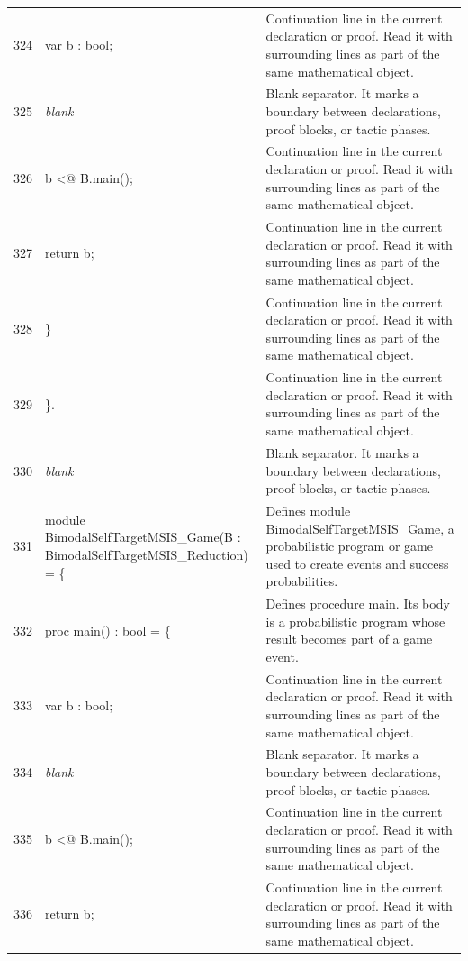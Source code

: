\documentclass[10pt]{article}
\begin{document}
\begin{longtable}{r L{0.53\textwidth} L{0.37\textwidth}}
324 & {\ttfamily\scriptsize     var b : bool;} & Continuation line in the current declaration or proof.  Read it with surrounding lines as part of the same mathematical object. \\
325 & {\ttfamily\scriptsize \emph{blank}} & Blank separator.  It marks a boundary between declarations, proof blocks, or tactic phases. \\
326 & {\ttfamily\scriptsize     b <@ B.main();} & Continuation line in the current declaration or proof.  Read it with surrounding lines as part of the same mathematical object. \\
327 & {\ttfamily\scriptsize     return b;} & Continuation line in the current declaration or proof.  Read it with surrounding lines as part of the same mathematical object. \\
328 & {\ttfamily\scriptsize   \}} & Continuation line in the current declaration or proof.  Read it with surrounding lines as part of the same mathematical object. \\
329 & {\ttfamily\scriptsize \}.} & Continuation line in the current declaration or proof.  Read it with surrounding lines as part of the same mathematical object. \\
330 & {\ttfamily\scriptsize \emph{blank}} & Blank separator.  It marks a boundary between declarations, proof blocks, or tactic phases. \\
331 & {\ttfamily\scriptsize module BimodalSelfTargetMSIS\_Game(B : BimodalSelfTargetMSIS\_Reduction) = \{} & Defines module BimodalSelfTargetMSIS\_Game, a probabilistic program or game used to create events and success probabilities. \\
332 & {\ttfamily\scriptsize   proc main() : bool = \{} & Defines procedure main.  Its body is a probabilistic program whose result becomes part of a game event. \\
333 & {\ttfamily\scriptsize     var b : bool;} & Continuation line in the current declaration or proof.  Read it with surrounding lines as part of the same mathematical object. \\
334 & {\ttfamily\scriptsize \emph{blank}} & Blank separator.  It marks a boundary between declarations, proof blocks, or tactic phases. \\
335 & {\ttfamily\scriptsize     b <@ B.main();} & Continuation line in the current declaration or proof.  Read it with surrounding lines as part of the same mathematical object. \\
336 & {\ttfamily\scriptsize     return b;} & Continuation line in the current declaration or proof.  Read it with surrounding lines as part of the same mathematical object. \\

\end{longtable}
\end{document}
